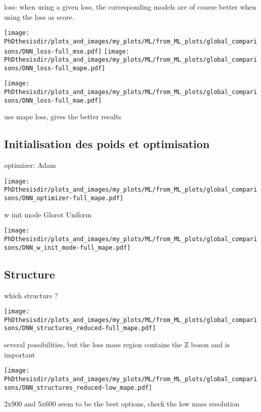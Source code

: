 loss: when using a given loss, the corresponding models are of course better when using the loss as score.

\texttt{[image: \\PhDthesisdir/plots\_and\_images/my\_plots/ML/from\_ML\_plots/global\_comparisons/DNN\_loss-full\_mse.pdf]}
\texttt{[image: \\PhDthesisdir/plots\_and\_images/my\_plots/ML/from\_ML\_plots/global\_comparisons/DNN\_loss-full\_mape.pdf]}



\texttt{[image: \\PhDthesisdir/plots\_and\_images/my\_plots/ML/from\_ML\_plots/global\_comparisons/DNN\_loss-full\_mae.pdf]}


use mape loss, gives the better results

\subsection{Initialisation des poids et optimisation}

optimizer: Adam

\texttt{[image: \\PhDthesisdir/plots\_and\_images/my\_plots/ML/from\_ML\_plots/global\_comparisons/DNN\_optimizer-full\_mape.pdf]}

w init mode Glorot Uniform

\texttt{[image: \\PhDthesisdir/plots\_and\_images/my\_plots/ML/from\_ML\_plots/global\_comparisons/DNN\_w\_init\_mode-full\_mape.pdf]}

\subsection{Structure}
which structure ?

\texttt{[image: \\PhDthesisdir/plots\_and\_images/my\_plots/ML/from\_ML\_plots/global\_comparisons/DNN\_structures\_reduced-full\_mape.pdf]}

several possibilities, but the loss mass region contains the Z boson and is important

\texttt{[image: \\PhDthesisdir/plots\_and\_images/my\_plots/ML/from\_ML\_plots/global\_comparisons/DNN\_structures\_reduced-low\_mape.pdf]}

2x900 and 5x600 seem to be the best options, check the low mass resolution

